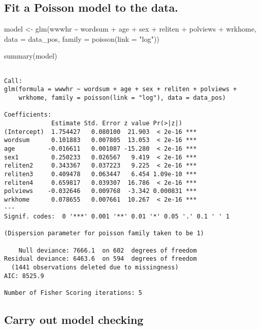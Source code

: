 \documentclass[
  letterpaper,
  DIV=11,
  numbers=noendperiod]{scrartcl}
\newenvironment{Shaded}{\begin{snugshade}}{\end{snugshade}}
\newcommand{\AttributeTok}[1]{\textcolor[rgb]{0.40,0.45,0.13}{#1}}
\newcommand{\FunctionTok}[1]{\textcolor[rgb]{0.28,0.35,0.67}{#1}}
\newcommand{\NormalTok}[1]{\textcolor[rgb]{0.00,0.23,0.31}{#1}}
\newcommand{\OtherTok}[1]{\textcolor[rgb]{0.00,0.23,0.31}{#1}}
\newcommand{\SpecialCharTok}[1]{\textcolor[rgb]{0.37,0.37,0.37}{#1}}
\newcommand{\StringTok}[1]{\textcolor[rgb]{0.13,0.47,0.30}{#1}}
\begin{document}
\subsection{Fit a Poisson model to the
data.}\label{fit-a-poisson-model-to-the-data.}

\begin{Shaded}
\begin{Highlighting}[]
\NormalTok{model }\OtherTok{\textless{}{-}} \FunctionTok{glm}\NormalTok{(wwwhr }\SpecialCharTok{\textasciitilde{}}\NormalTok{ wordsum }\SpecialCharTok{+}\NormalTok{ age }\SpecialCharTok{+}\NormalTok{ sex }\SpecialCharTok{+}\NormalTok{ reliten }\SpecialCharTok{+}\NormalTok{ polviews }\SpecialCharTok{+}\NormalTok{ wrkhome, }
                     \AttributeTok{data =}\NormalTok{ data\_pos, }\AttributeTok{family =} \FunctionTok{poisson}\NormalTok{(}\AttributeTok{link =} \StringTok{"log"}\NormalTok{))}

\FunctionTok{summary}\NormalTok{(model)}
\end{Highlighting}
\end{Shaded}

\begin{verbatim}

Call:
glm(formula = wwwhr ~ wordsum + age + sex + reliten + polviews + 
    wrkhome, family = poisson(link = "log"), data = data_pos)

Coefficients:
             Estimate Std. Error z value Pr(>|z|)    
(Intercept)  1.754427   0.080100  21.903  < 2e-16 ***
wordsum      0.101883   0.007805  13.053  < 2e-16 ***
age         -0.016611   0.001087 -15.280  < 2e-16 ***
sex1         0.250233   0.026567   9.419  < 2e-16 ***
reliten2     0.343367   0.037223   9.225  < 2e-16 ***
reliten3     0.409478   0.063447   6.454 1.09e-10 ***
reliten4     0.659817   0.039307  16.786  < 2e-16 ***
polviews    -0.032646   0.009768  -3.342 0.000831 ***
wrkhome      0.078655   0.007661  10.267  < 2e-16 ***
---
Signif. codes:  0 '***' 0.001 '**' 0.01 '*' 0.05 '.' 0.1 ' ' 1

(Dispersion parameter for poisson family taken to be 1)

    Null deviance: 7666.1  on 602  degrees of freedom
Residual deviance: 6463.6  on 594  degrees of freedom
  (1441 observations deleted due to missingness)
AIC: 8525.9

Number of Fisher Scoring iterations: 5
\end{verbatim}

\subsection{Carry out model checking}\label{carry-out-model-checking}
\end{document}
